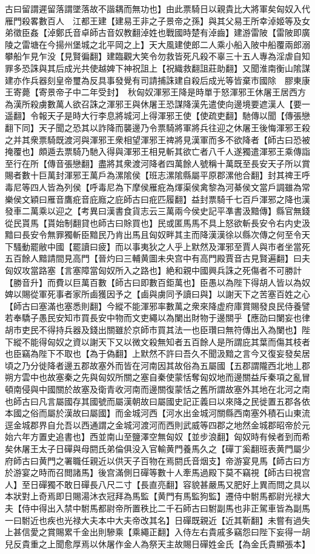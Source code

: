 古曰留謂遲留落謂墜落故不諧耦而無功也】由此票騎日以親貴比大將軍矣匈奴入代雁門殺畧數百人　江都王建【建易王非之子景帝之孫】與其父易王所幸淖姬等及女弟徵臣姦【淖鄭氏音卓師古音奴教翻淖姓也戰國時楚有淖齒】建游雷陂【雷陂即廣陵之雷塘在今揚州堡城之北平岡之上】天大風建使郎二人乘小船入陂中船覆兩郎溺攀船乍見乍没【見賢徧翻】建臨觀大笑令勿救皆死凡殺不辜三十五人專為淫虐自知罪多恐誅與其后成光共使越婢下神祝詛上【祝織救翻詛莊助翻】又聞淮南衡山隂謀建亦作兵器刻皇帝璽為反具事發覺有司請捕誅建自殺后成光等皆棄市國除　膠東康王寄薨【寄景帝子中二年受封】　秋匈奴渾邪王降是時單于怒渾邪王休屠王居西方為漢所殺虜數萬人欲召誅之渾邪王與休屠王恐謀降漢先遣使向邊境要遮漢人【要一遥翻】令報天子是時大行李息將城河上得渾邪王使【使疏吏翻】馳傳以聞【傳張戀翻下同】天子聞之恐其以詐降而襲邊乃令票騎將軍將兵往迎之休屠王後悔渾邪王殺之并其衆票騎既渡河與渾邪王衆相望渾邪王禆將見漢軍而多不欲降者【師古曰恐被掩覆也】頗遁去票騎乃馳入得與渾邪王相見斬其欲亡者八千人遂獨遣渾邪王乘傳詣至行在所【傳音張戀翻】盡將其衆渡河降者四萬餘人號稱十萬既至長安天子所以賞賜者數十巨萬封渾邪王萬戶為漯隂侯【班志漯隂縣屬平原郡漯他合翻】封其禆王呼毒尼等四人皆為列侯【呼毒尼為下摩侯雁疪為煇渠侯禽黎為河綦侯文當戶調雖為常樂侯文穎曰雁音鷹疪音庇廕之庇師古曰疪匹履翻】益封票騎千七百戶渾邪之降也漢發車二萬乘以迎之【考異曰漢書食貨志云三萬兩今侯史記平凖書汲黯傳】縣官無錢從民貰馬【貰始制翻貸也師古曰賖買也】民或匿馬馬不具上怒欲斬長安令右内史汲黯曰長安令無罪獨斬臣黯民乃肯出馬且匈奴畔其主而降漢漢徐以縣次傳之何至令天下騷動罷敝中國【罷讀曰疲】而以事夷狄之人乎上默然及渾邪至賈人與市者坐當死五百餘人黯請間見高門【晉灼曰三輔黄圖未央宫中有高門殿賈音古見賢遍翻】曰夫匈奴攻當路塞【言塞障當匈奴所入之路也】絶和親中國興兵誅之死傷者不可勝計【勝音升】而費以巨萬百數【師古曰即數百鉅萬也】臣愚以為陛下得胡人皆以為奴婢以賜從軍死事者家所鹵獲因予之【鹵與虜同予讀曰與】以謝天下之苦塞百姓之心【師古曰塞滿也塞悉則翻】今縱不能渾邪率數萬之衆來降虚府庫賞賜發良民侍養譬若奉驕子愚民安知市買長安中物而文吏繩以為闌出財物于邊關乎【應劭曰闌妄也律胡市吏民不得持兵器及錢出關雖於京師市買其法一也臣瓚曰無符傳出入為闌也】陛下縱不能得匈奴之資以謝天下又以微文殺無知者五百餘人是所謂庇其葉而傷其枝者也臣竊為陛下不取也【為于偽翻】上默然不許曰吾久不聞汲黯之言今又復妄發矣居頃之乃分徙降者邊五郡故塞外而皆在河南因其故俗為五屬國【五郡謂隴西北地丄郡朔方雲中也故塞秦之先與匈奴所關之塞自秦使蒙恬奪匈奴地而邊關益斥秦項之亂冒頓南侵與中國關於故塞及衛青收河南而邊關復蒙恬之舊所謂故塞外其地在北河之南也師古曰凡言屬國存其國號而屬漢朝故曰屬國史記正義曰以來降之民徙置五郡各依本國之俗而屬於漢故曰屬國】而金城河西【河水出金城河關縣西南塞外積石山東流逕金城郡界自允吾以西通謂之金城河渡河而西則武威等四郡之地然金城郡昭帝於元始六年方置史追書也】西並南山至鹽澤空無匈奴【並步浪翻】匈奴時有候者到而希矣休屠王太子日磾與母閼氏弟倫俱没入官輸黄門養馬久之【磾丁奚翻班表黄門屬少府師古曰黄門之署職任親近以供天子百物在焉閼氏音烟支】帝游宴見馬【師古曰方於游宴之時而召閲諸馬】後宫滿側日磾等數十人牽馬過殿下莫不竊視【師古曰視宫人】至日磾獨不敢日磾長八尺二寸【長直亮翻】容貌甚嚴馬又肥好上異而問之具以本狀對上奇焉即日賜湯沐衣冠拜為馬監【黄門有馬監狗監】遷侍中駙馬都尉光禄大夫【侍中得出入禁中駙馬都尉帝所置秩比二千石師古曰駙副馬也非正駕車皆為副馬一曰駙近也疾也光禄大夫本中大夫帝改其名】日磾既親近【近其靳翻】未嘗有過失上甚信愛之賞賜累千金出則驂乘【乘繩正翻】入侍左右貴戚多竊怨曰陛下妄得一胡兒反貴重之上聞愈厚焉以休屠作金人為祭天主故賜日磾姓金氏【為金氏貴顯張本】

